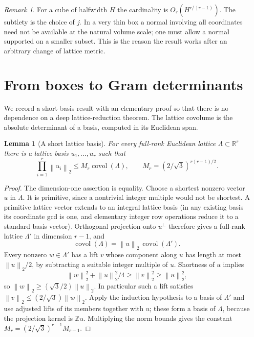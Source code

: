 \documentclass[11pt]{article}
\newtheorem{lemma}[theorem]{Lemma}
\theoremstyle{remark}\newtheorem{remark}[theorem]{Remark}
\newcommand{\Z}{\mathbb Z}\newcommand{\R}{\mathbb R}\newcommand{\F}{\mathbb F}
\newcommand{\covol}{\operatorname{covol}}
\newcommand{\norm}[1]{\left\lVert #1\right\rVert}
\begin{document}
\begin{remark}
For a cube of halfwidth $H$ the cardinality is $O_r(H^{r/(r-1)})$. The subtlety is the choice of $j$. In a very thin box a normal involving all coordinates need not be available at the natural volume scale; one must allow a normal supported on a smaller subset. This is the reason the result works after an arbitrary change of lattice metric.
\end{remark}

\section{From boxes to Gram determinants}
We record a short-basis result with an elementary proof so that there is no dependence on a deep lattice-reduction theorem. The lattice covolume is the absolute determinant of a basis, computed in its Euclidean span.

\begin{lemma}[A short lattice basis]\label{lem:basis}
For every full-rank Euclidean lattice $\Lambda\subset\R^r$ there is a lattice basis $u_1,\ldots,u_r$ such that
\begin{equation}\label{eq:short}
 \prod_{i=1}^r\norm{u_i}_2\le M_r\covol(\Lambda),\qquad
 M_r=(2/\sqrt3)^{r(r-1)/2}.
\end{equation}
\end{lemma}
\begin{proof}
The dimension-one assertion is equality. Choose a shortest nonzero vector $u$ in $\Lambda$. It is primitive, since a nontrivial integer multiple would not be shortest. A primitive lattice vector extends to an integral lattice basis (in any existing basis its coordinate gcd is one, and elementary integer row operations reduce it to a standard basis vector). Orthogonal projection onto $u^\perp$ therefore gives a full-rank lattice $\Lambda'$ in dimension $r-1$, and
\[
 \covol(\Lambda)=\norm u_2\,\covol(\Lambda').
\]
Every nonzero $w\in\Lambda'$ has a lift $v$ whose component along $u$ has length at most $\norm u_2/2$, by subtracting a suitable integer multiple of $u$. Shortness of $u$ implies
\[
 \norm w_2^2+\norm u_2^2/4\ge\norm v_2^2\ge\norm u_2^2,
\]
so $\norm w_2\ge(\sqrt3/2)\norm u_2$. In particular such a lift satisfies $\norm v_2\le(2/\sqrt3)\norm w_2$. Apply the induction hypothesis to a basis of $\Lambda'$ and use adjusted lifts of its members together with $u$; these form a basis of $\Lambda$, because the projection kernel is $\Z u$. Multiplying the norm bounds gives the constant $M_r=(2/\sqrt3)^{r-1}M_{r-1}$.
\end{proof}
\end{document}
